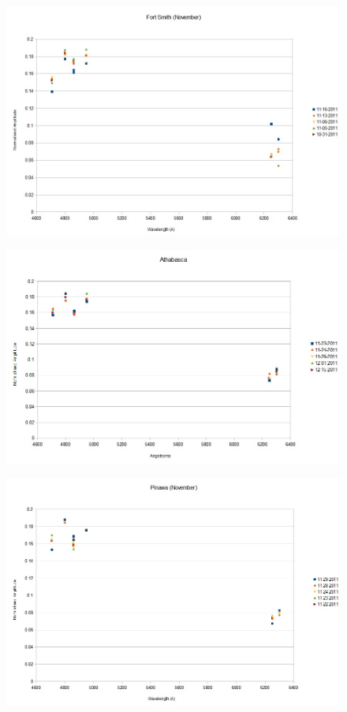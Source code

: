 \documentclass[11pt]{article}
\begin{document}
\begin{figure}
\includegraphics[scale=0.6]{norm_fortsmith_november.jpg}
\end{figure}

\begin{figure}
\includegraphics[scale=0.6]{norm_athabasca.jpg}
\end{figure}

\begin{figure}
\includegraphics[scale=0.6]{norm_pinawa_november.jpg}
\end{figure}
\end{document}
